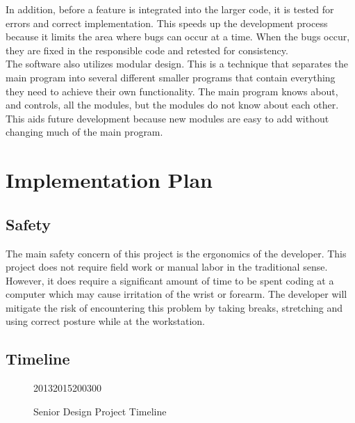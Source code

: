 \documentclass[12pt]{article}
\begin{document}
In addition, before a feature is integrated into the larger code, it is tested for errors and correct implementation. This speeds up the development process because it limits the area where bugs can occur at a time. When the bugs occur, they are fixed in the responsible code and retested for consistency. \\ 

The software also utilizes modular design. This is a technique that separates the main program into several different smaller programs that contain everything they need to achieve their own functionality. The main program knows about, and controls, all the modules, but the modules do not know about each other. This aids future development because new modules are easy to add without changing much of the main program.

\section{Implementation Plan}
\subsection{Safety}

The main safety concern of this project is the ergonomics of the developer. This project does not require field work or manual labor in the traditional sense. However, it does require a significant amount of time to be spent coding at a computer which may cause irritation of the wrist or forearm. The developer will mitigate the risk of encountering this problem by taking breaks, stretching and using correct posture while at the workstation.

\subsection{Timeline}

\begin{figure}[H]

\begin{timeline}{2013}{2015}{200}{300}
  
  
\end{timeline}
\caption{Senior Design Project Timeline}
\end{figure}
\end{document}
